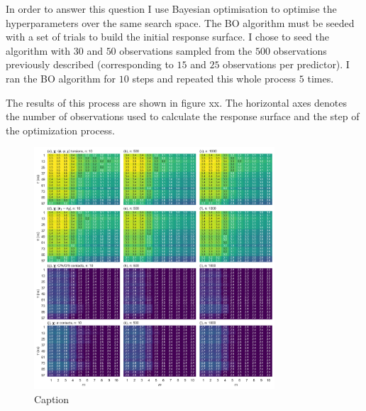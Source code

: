 In order to answer this question I use Bayesian optimisation to optimise the hyperparameters over the same search space. The BO algorithm must be seeded with a set of trials to build the initial response surface. I chose to seed the algorithm with $30$ and $50$ observations sampled from the $500$ observations previously described (corresponding to $15$ and $25$ observations per predictor). I ran the BO algorithm for $10$ steps and repeated this whole process $5$ times. 


The results of this process are shown in figure xx. The horizontal axes denotes the number of observations used to calculate the response surface and the step of the optimization process. 

\begin{figure}
    \centering
    \includegraphics[width=0.8\textwidth]{chapters/msm_optimization/figures/aadh_response_surface_d.png}
    \caption{Caption}
    \label{fig:asdafadf}
\end{figure}


